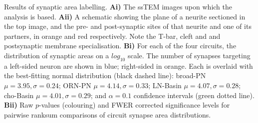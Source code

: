 Results of synaptic area labelling.
\textbf{Ai)} The ssTEM images upon which the analysis is based.
\textbf{Aii)} A schematic showing the plane of a neurite sectioned in the top image, and the pre- and post-synaptic sites of that neurite and one of its partners, in orange and red respectively.
Note the T-bar, cleft and and postsynaptic membrane specialisation.
\textbf{Bi)} For each of the four circuits, the distribution of synaptic areas on a $log_{10}$ scale.
The number of synapses targeting a left-sided neuron are shown in blue; right-sided in orange.
Each is overlaid with the best-fitting normal distribution (black dashed line):
broad-PN $\mu = 3.95, \sigma = 0.24$;
ORN-PN $\mu = 4.14, \sigma = 0.33$;
LN-Basin $\mu = 4.07, \sigma = 0.28$;
cho-Basin $\mu = 4.01, \sigma = 0.29$;
and $\alpha = 0.1$ confidence intervals (green dotted line).
\textbf{Bii)} Raw $p$-values (colouring) and FWER corrected \citep*{Holm1979} significance levels for pairwise ranksum comparisons of circuit synapse area distributions.